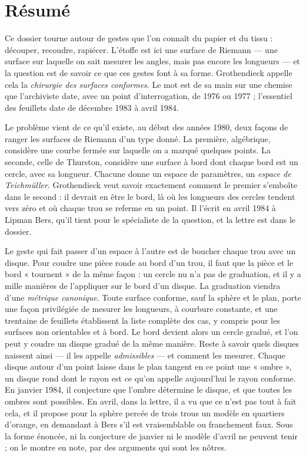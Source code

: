 \documentclass[11pt,a4paper]{article}
\begin{document}
\section*{Résumé}

\begin{resume}
Ce dossier tourne autour de gestes que l'on connaît du papier et du tissu :
découper, recoudre, rapiécer. L'étoffe est ici une surface de Riemann ---
une surface sur laquelle on sait mesurer les angles, mais pas encore les
longueurs --- et la question est de savoir ce que ces gestes font à sa forme.
Grothendieck appelle cela la \emph{chirurgie des surfaces conformes}. Le mot
est de sa main sur une chemise que l'archiviste date, avec un point
d'interrogation, de 1976 ou 1977 ; l'essentiel des feuillets date de
décembre 1983 à avril 1984.

Le problème vient de ce qu'il existe, au début des années 1980, deux façons
de ranger les surfaces de Riemann d'un type donné. La première, algébrique,
considère une courbe fermée sur laquelle on a marqué quelques points. La
seconde, celle de Thurston, considère une surface à bord dont chaque bord est
un cercle, avec sa longueur. Chacune donne un espace de paramètres, un
\emph{espace de Teichmüller}. Grothendieck veut savoir exactement comment le
premier s'emboîte dans le second : il devrait en être le bord, là où les
longueurs des cercles tendent vers zéro et où chaque trou se referme en un
point. Il l'écrit en avril 1984 à Lipman Bers, qu'il tient pour le spécialiste
de la question, et la lettre est dans le dossier.

Le geste qui fait passer d'un espace à l'autre est de boucher chaque trou avec
un disque. Pour coudre une pièce ronde au bord d'un trou, il faut que la pièce
et le bord « tournent » de la même façon : un cercle nu n'a pas de graduation,
et il y a mille manières de l'appliquer sur le bord d'un disque. La graduation
viendra d'une \emph{métrique canonique}. Toute surface conforme, sauf la
sphère et le plan, porte une façon privilégiée de mesurer les longueurs, à
courbure constante, et une trentaine de feuillets établissent la liste
complète des cas, y compris pour les surfaces non orientables et à bord. Le
bord devient alors un cercle gradué, et l'on peut y coudre un disque gradué de
la même manière. Reste à savoir quels disques naissent ainsi --- il les appelle
\emph{admissibles} --- et comment les mesurer. Chaque disque autour d'un point
laisse dans le plan tangent en ce point une « ombre », un disque rond dont le
rayon est ce qu'on appelle aujourd'hui le rayon conforme. En janvier 1984, il
conjecture que l'ombre détermine le disque, et que toutes les ombres sont
possibles. En avril, dans la lettre, il a vu que ce n'est pas tout à fait
cela, et il propose pour la sphère percée de trois trous un modèle en
quartiers d'orange, en demandant à Bers s'il est vraisemblable ou
franchement faux. Sous la forme énoncée, ni la conjecture de janvier ni le
modèle d'avril ne peuvent tenir ; on le montre en note, par des arguments qui
sont les nôtres.


\end{resume}
\end{document}
